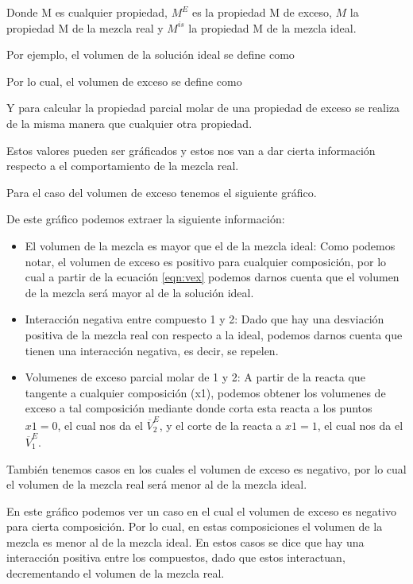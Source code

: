 
Donde M es cualquier propiedad, $M^E$ es la propiedad M de exceso, $M$ la propiedad M de la mezcla real y $M^{is}$ la propiedad M de la mezcla ideal.

Por ejemplo, el volumen de la solución ideal se define como 

Por lo cual, el volumen de exceso se define como

Y para calcular la propiedad parcial molar de una propiedad de exceso se realiza de la misma manera que cualquier otra propiedad.


Estos valores pueden ser gráficados y estos nos van a dar cierta información respecto a el comportamiento de la mezcla real.

Para el caso del volumen de exceso tenemos el siguiente gráfico.


De este gráfico podemos extraer la siguiente información:

\begin{itemize}
    \item El volumen de la mezcla es mayor que el de la mezcla ideal: Como podemos notar, el volumen de exceso es positivo para cualquier composición, por lo cual 
    a partir de la ecuación \ref{eqn:vex} podemos darnos cuenta que el volumen de la mezcla será mayor al de la solución ideal.
    \item Interacción negativa entre compuesto 1 y 2: Dado que hay una desviación positiva de la mezcla real con respecto a la ideal, podemos darnos cuenta que tienen una interacción negativa, es decir, se repelen.
    \item Volumenes de exceso parcial molar de 1 y 2: A partir de la reacta que tangente a cualquier composición (x1), podemos obtener los volumenes de exceso a tal composición mediante donde corta esta reacta a los puntos $x1=0$, el cual nos da el $\overline{V}_2^E$, y el corte de la reacta a $x1=1$, el cual nos da el $\overline{V}_1^E$.
\end{itemize}

También tenemos casos en los cuales el volumen de exceso es negativo, por lo cual el volumen de la mezcla real será menor al de la mezcla ideal.


En este gráfico podemos ver un caso en el cual el volumen de exceso es negativo para cierta composición. Por lo cual, en estas composiciones el volumen de la mezcla es menor al de la mezcla ideal. En estos casos
se dice que hay una interacción positiva entre los compuestos, dado que estos interactuan, decrementando el volumen de la mezcla real.


